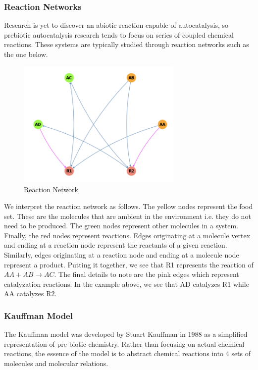\documentclass[11pt]{article}
\begin{document}
\subsubsection*{Reaction Networks}

Research is yet to discover an abiotic reaction capable of autocatalysis, so prebiotic autocatalysis research tends to focus on series of coupled chemical reactions. 
These systems are typically studied through reaction networks such as the one below. 

\begin{figure}[H]
    \centering
    \includegraphics[width=8cm]{reaction_network}
    \caption{Reaction Network}
\end{figure}

We interpret the reaction network as follows. The yellow nodes represent the food set. These are the molecules that are ambient in the environment i.e. they do not need to be produced. 
The green nodes represent other molecules in a system. Finally, the red nodes represent reactions. Edges originating at a molecule vertex and ending at a reaction node represent the reactants of a given reaction.
Similarly, edges originating at a reaction node and ending at a molecule node represent a product. 
Putting it together, we see that R1 represents the reaction of $AA + AB \rightarrow AC$. 
The final details to note are the pink edges which represent catalyzation reactions. In the example above, we see that AD catalyzes R1 while AA catalyzes R2.


\subsubsection{Kauffman Model}

The Kauffman model was developed by Stuart Kauffman in 1988 as a simplified representation of pre-biotic chemistry. 
Rather than focusing on actual chemical reactions, the essence of the model is to abstract chemical reactions into 4 sets of molecules and molecular relations.
\end{document}
